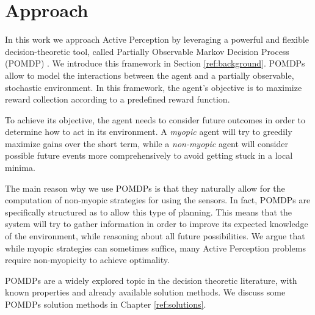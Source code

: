 \section{Approach}

In this work we approach Active Perception by leveraging a powerful and flexible decision-theoretic
tool, called Partially Observable Markov Decision Process (POMDP) \cite{cit:pomdp}. We introduce
this framework in Section \ref{ref:background}. POMDPs allow to model the interactions between the
agent and a partially observable, stochastic environment.  In this framework, the agent's objective
is to maximize reward collection according to a predefined reward function.

To achieve its objective, the agent needs to consider future outcomes in order to determine how to
act in its environment. A \textit{myopic} agent will try to greedily maximize gains over the short
term, while a \textit{non-myopic} agent will consider possible future events more comprehensively to
 avoid getting stuck in a local minima.

The main reason why we use POMDPs is that they naturally allow for the computation of non-myopic
strategies for using the sensors. In fact, POMDPs are specifically structured as to allow this type
of planning. This means that the system will try to gather information in order to improve its
expected knowledge of the environment, while reasoning about all future possibilities. We argue that
while myopic strategies can sometimes suffice, many Active Perception problems require non-myopicity
to achieve optimality.


POMDPs are a widely explored topic in the decision theoretic literature, with known properties and
already available solution methods. We discuss some POMDPs solution methods in Chapter
\ref{ref:solutions}.


